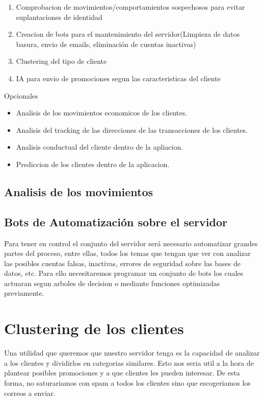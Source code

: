 \documentclass{article}
\theoremstyle{definition}
\begin{document}
\begin{enumerate}
\item Comprobacion de movimientos/comportamientos sospechosos para evitar suplantaciones de identidad
\item Creacion de bots para el mantenimiento del servidor(Limpieza de datos basura, envio de emails, eliminación de cuentas inactivas)
\item Clustering del tipo de cliente
\item IA para envio de promociones segun las caracteristicas del cliente
\end{enumerate}

Opcionales

\begin{itemize}
    \item Analisis de los movimientos economicos de los clientes.
    \item Analisis del tracking de las direcciones de las transacciones de los clientes.
    \item Analisis conductual del cliente dentro de la apliacion.
    \item Prediccion de los clientes dentro de la aplicacion.
\end{itemize}


\subsection{Analisis de los movimientos}

\subsection{Bots de Automatización sobre el servidor}

Para tener en control el conjunto del servidor será necesario automatizar grandes partes del proceso, entre ellas, todos los temas que tengan que ver con analizar las posibles cuentas falsas, inactivas, errores de seguridad sobre las bases de datos, etc. Para ello necesitaremos programar un conjunto de bots los cuales actuaran segun arboles de decision o mediante funciones optimizadas previamente.


\section{Clustering de los clientes}

Una utilidad que queremos que nuestro servidor tenga es la capacidad de analizar a los clientes y dividirlos en categorias similares. Esto nos seria util a la hora de plantear posibles promociones y a que clientes les pueden interesar. De esta forma, no saturariamos con spam a todos los clientes sino que escogeriamos los correos a enviar. 
\end{document}
